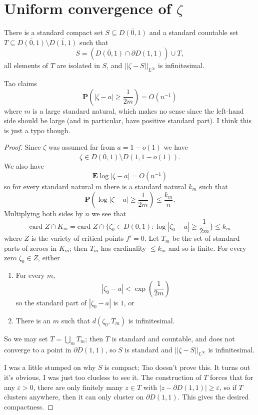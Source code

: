 \documentclass[12pt]{article}
\begin{document}
\section{Uniform convergence of $\zeta$}
\begin{lemma}
There is a standard compact set $S \subseteq \overline{D(0, 1)}$ and a standard countable set $T \subseteq \overline{D(0, 1)} \setminus \overline{D(1, 1)}$ such that
$$S = (\overline{D(0, 1)} \cap \partial D(1, 1)) \cup T,$$
all elements of $T$ are isolated in $S$, and $||\zeta - S||_{L^\infty}$ is infinitesimal.
\end{lemma}
Tao claims
$$\mathbf P(|\zeta - a| \geq \frac{1}{2m}) = O(n^{-1})$$
where $m$ is a large standard natural, which makes no sense since the left-hand side should be large (and in particular, have positive standard part).
I think this is just a typo though.

\begin{proof}
Since $\zeta$ was assumed far from $a = 1 - o(1)$ we have
$$\zeta \in \overline{D(0, 1)} \setminus D(1, 1 - o(1)).$$
We also have
$$\mathbf E \log |\zeta - a| = O(n^{-1})$$
so for every standard natural $m$ there is a standard natural $k_m$ such that
$$\mathbf P(\log |\zeta - a| \geq \frac{1}{2m}) \leq \frac{k_m}{n}.$$
Multiplying both sides by $n$ we see that
$$\text{card } Z \cap K_m = \text{card } Z \cap \{\zeta_0 \in \overline{D(0, 1)}: \log |\zeta_0 - a| \geq \frac{1}{2m}\} \leq k_m$$
where $Z$ is the variety of critical points $f' = 0$.
Let $T_m$ be the set of standard parts of zeroes in $K_m$; then $T_m$ has cardinality $\leq k_m$ and so is finite.
For every zero $\zeta_0 \in Z$, either
\begin{enumerate}
\item For every $m$,
$$|\zeta_0 - a| < \exp\left(\frac{1}{2m}\right)$$
so the standard part of $|\zeta_0 - a|$ is $1$, or
\item There is an $m$ such that $d(\zeta_0, T_m)$ is infinitesimal.
\end{enumerate}
So we may set $T = \bigcup_m T_m$; then $T$ is standard and countable, and does not converge to a point in $\partial D(1, 1)$, so $S$ is standard and $||\zeta - S||_{L^\infty}$ is infinitesimal.

I was a little stumped on why $S$ is compact; Tao doesn't prove this.
It turns out it's obvious, I was just too clueless to see it.
The construction of $T$ forces that for any $\varepsilon > 0$, there are only finitely many $z \in T$ with $|z - \partial D(1, 1)| \geq \varepsilon$, so if $T$ clusters anywhere, then it can only cluster on $\partial D(1, 1)$.
This gives the desired compactness.
\end{proof}
\end{document}
